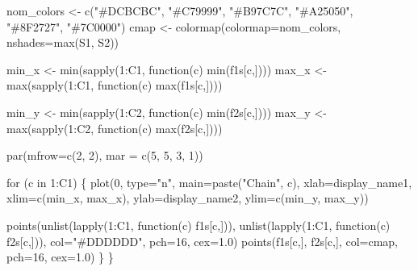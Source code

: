 \documentclass[
  letterpaper,
  DIV=11,
  numbers=noendperiod]{scrartcl}
\newenvironment{Shaded}{\begin{snugshade}}{\end{snugshade}}
\newcommand{\BuiltInTok}[1]{\textcolor[rgb]{0.00,0.23,0.31}{#1}}
\newcommand{\ControlFlowTok}[1]{\textcolor[rgb]{0.00,0.23,0.31}{#1}}
\newcommand{\DecValTok}[1]{\textcolor[rgb]{0.68,0.00,0.00}{#1}}
\newcommand{\FloatTok}[1]{\textcolor[rgb]{0.68,0.00,0.00}{#1}}
\newcommand{\KeywordTok}[1]{\textcolor[rgb]{0.00,0.23,0.31}{#1}}
\newcommand{\NormalTok}[1]{\textcolor[rgb]{0.00,0.23,0.31}{#1}}
\newcommand{\OperatorTok}[1]{\textcolor[rgb]{0.37,0.37,0.37}{#1}}
\newcommand{\StringTok}[1]{\textcolor[rgb]{0.13,0.47,0.30}{#1}}
\begin{document}
\begin{Shaded}
\begin{Highlighting}[]
\NormalTok{  nom\_colors }\OperatorTok{\textless{}{-}}\NormalTok{ c(}\StringTok{"\#DCBCBC"}\NormalTok{, }\StringTok{"\#C79999"}\NormalTok{, }\StringTok{"\#B97C7C"}\NormalTok{,}
                  \StringTok{"\#A25050"}\NormalTok{, }\StringTok{"\#8F2727"}\NormalTok{, }\StringTok{"\#7C0000"}\NormalTok{)}
\NormalTok{  cmap }\OperatorTok{\textless{}{-}}\NormalTok{ colormap(colormap}\OperatorTok{=}\NormalTok{nom\_colors, nshades}\OperatorTok{=}\BuiltInTok{max}\NormalTok{(S1, S2))}

\NormalTok{  min\_x }\OperatorTok{\textless{}{-}} \BuiltInTok{min}\NormalTok{(sapply(}\DecValTok{1}\NormalTok{:C1, function(c) }\BuiltInTok{min}\NormalTok{(f1s[c,])))}
\NormalTok{  max\_x }\OperatorTok{\textless{}{-}} \BuiltInTok{max}\NormalTok{(sapply(}\DecValTok{1}\NormalTok{:C1, function(c) }\BuiltInTok{max}\NormalTok{(f1s[c,])))}

\NormalTok{  min\_y }\OperatorTok{\textless{}{-}} \BuiltInTok{min}\NormalTok{(sapply(}\DecValTok{1}\NormalTok{:C2, function(c) }\BuiltInTok{min}\NormalTok{(f2s[c,])))}
\NormalTok{  max\_y }\OperatorTok{\textless{}{-}} \BuiltInTok{max}\NormalTok{(sapply(}\DecValTok{1}\NormalTok{:C2, function(c) }\BuiltInTok{max}\NormalTok{(f2s[c,])))}

\NormalTok{  par(mfrow}\OperatorTok{=}\NormalTok{c(}\DecValTok{2}\NormalTok{, }\DecValTok{2}\NormalTok{), mar }\OperatorTok{=}\NormalTok{ c(}\DecValTok{5}\NormalTok{, }\DecValTok{5}\NormalTok{, }\DecValTok{3}\NormalTok{, }\DecValTok{1}\NormalTok{))}

  \ControlFlowTok{for}\NormalTok{ (c }\KeywordTok{in} \DecValTok{1}\NormalTok{:C1) \{}
\NormalTok{    plot(}\DecValTok{0}\NormalTok{, }\BuiltInTok{type}\OperatorTok{=}\StringTok{"n"}\NormalTok{, main}\OperatorTok{=}\NormalTok{paste(}\StringTok{"Chain"}\NormalTok{, c),}
\NormalTok{         xlab}\OperatorTok{=}\NormalTok{display\_name1, xlim}\OperatorTok{=}\NormalTok{c(min\_x, max\_x),}
\NormalTok{         ylab}\OperatorTok{=}\NormalTok{display\_name2, ylim}\OperatorTok{=}\NormalTok{c(min\_y, max\_y))}
  
\NormalTok{    points(unlist(lapply(}\DecValTok{1}\NormalTok{:C1, function(c) f1s[c,])),}
\NormalTok{           unlist(lapply(}\DecValTok{1}\NormalTok{:C1, function(c) f2s[c,])),}
\NormalTok{           col}\OperatorTok{=}\StringTok{"\#DDDDDD"}\NormalTok{, pch}\OperatorTok{=}\DecValTok{16}\NormalTok{, cex}\OperatorTok{=}\FloatTok{1.0}\NormalTok{)}
\NormalTok{    points(f1s[c,], f2s[c,], col}\OperatorTok{=}\NormalTok{cmap, pch}\OperatorTok{=}\DecValTok{16}\NormalTok{, cex}\OperatorTok{=}\FloatTok{1.0}\NormalTok{)}
\NormalTok{  \}}
\NormalTok{\}}
\end{Highlighting}
\end{Shaded}
\end{document}
